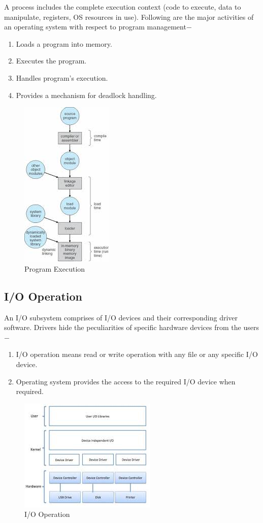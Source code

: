 \documentclass[a4paper,10pt]{article}
\begin{document}
A process includes the complete execution context (code to execute, data to manipulate, registers, OS resources in use). Following are the major activities of an operating system with respect to program management$-$
 \begin{enumerate}
  \item Loads a program into memory.
   \item Executes the program.  
    \item Handles program's execution.
     \item Provides a mechanism for deadlock handling.
\end{enumerate}
\begin{figure}[h]
\centering
\includegraphics{pe}
\caption{Program Execution}
\end{figure} 
\newpage
 \subsection{I/O Operation}
  An I/O subsystem comprises of I/O devices and their corresponding driver software. Drivers hide the peculiarities of specific hardware devices from the users$-$
  \begin{enumerate}
   \item I/O operation means read or write operation with any file or any specific I/O device.
    \item Operating system provides the access to the required I/O device when required.
    
  \end{enumerate}
  \begin{figure}[h]
\centering
\includegraphics{io}
\caption{I/O Operation}
\end{figure} 
  
\end{document}
